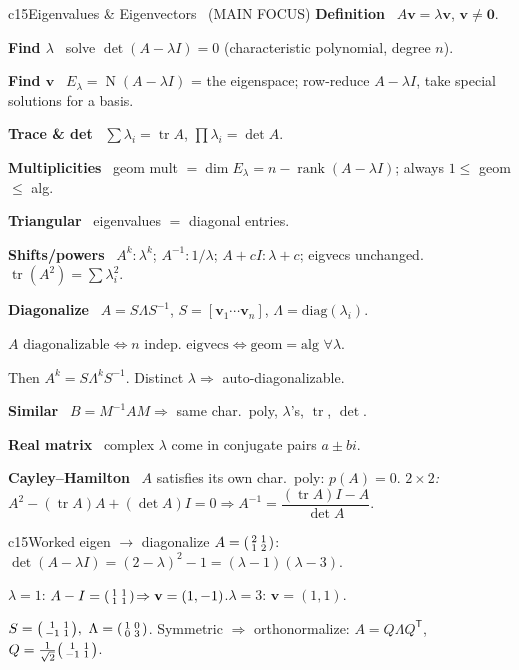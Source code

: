 \documentclass[10pt]{extarticle}
\newcommand{\h}[1]{{\bfseries #1}\ }
\newcommand{\key}[1]{\colorbox{hl}{$#1$}}
\newcommand{\T}{^{\mathsf T}}
\newcommand{\rank}{\operatorname{rank}}
\newcommand{\tr}{\operatorname{tr}}
\newcommand{\Nul}{\operatorname{N}}
\newcommand{\dimm}{\operatorname{dim}}
\newcommand{\bv}{\mathbf{v}}
\begin{document}
\begin{multicols}{2}
\begin{tbox}{c15}{Eigenvalues \& Eigenvectors \ \textnormal{(MAIN FOCUS)}}
\h{Definition} $A\bv=\lambda\bv$, $\bv\neq\mathbf0$.\par
\h{Find $\lambda$} solve \key{\det(A-\lambda I)=0} (characteristic polynomial, degree $n$).\par
\h{Find $\bv$} \key{E_\lambda=\Nul(A-\lambda I)} = the eigenspace; row-reduce $A-\lambda I$, take special solutions for a basis.\par
\h{Trace \& det} $\sum\lambda_i=\tr A$, \quad $\prod\lambda_i=\det A$.\par
\h{Multiplicities} geom mult $=\dimm E_\lambda=n-\rank(A-\lambda I)$; always $1\le$ geom $\le$ alg.\par
\h{Triangular} eigenvalues $=$ diagonal entries.\par
\h{Shifts/powers} $A^k\!:\lambda^k$; $A^{-1}\!:1/\lambda$; $A{+}cI:\lambda{+}c$; eigvecs unchanged. $\tr(A^2){=}\sum\lambda_i^2$.\par
\h{Diagonalize} $A=S\Lambda S^{-1}$, $S=[\bv_1\cdots\bv_n]$, $\Lambda=\mathrm{diag}(\lambda_i)$.\par
\key{A\text{ diagonalizable}\iff n\text{ indep. eigvecs}\iff\text{geom}=\text{alg }\forall\lambda}.\par
Then $A^k=S\Lambda^kS^{-1}$. Distinct $\lambda\Rightarrow$ auto-diagonalizable.\par
\h{Similar} $B=M^{-1}AM\Rightarrow$ same char.\ poly, $\lambda$'s, $\tr$, $\det$.\par
\h{Real matrix} complex $\lambda$ come in conjugate pairs $a\pm bi$.\par
\h{Cayley--Hamilton} $A$ satisfies its own char.\ poly: $p(A)=0$. \emph{$2{\times}2$:} $A^2-(\tr A)A+(\det A)I=0\Rightarrow A^{-1}=\dfrac{(\tr A)I-A}{\det A}$.
\end{tbox}

\begin{tbox}{c15}{Worked eigen $\to$ diagonalize}
\footnotesize $A=\begin{psmallmatrix}2&1\\1&2\end{psmallmatrix}$: $\det(A-\lambda I)=(2-\lambda)^2-1=(\lambda-1)(\lambda-3)$.\par
$\lambda{=}1$: $A-I=\begin{psmallmatrix}1&1\\1&1\end{psmallmatrix}\!\Rightarrow\bv=(1,-1)$.\quad $\lambda{=}3$: $\bv=(1,1)$.\par
$S=\begin{psmallmatrix}1&1\\-1&1\end{psmallmatrix},\ \Lambda=\begin{psmallmatrix}1&0\\0&3\end{psmallmatrix}$. Symmetric $\Rightarrow$ orthonormalize: $A=Q\Lambda Q\T$, $Q=\tfrac1{\sqrt2}\begin{psmallmatrix}1&1\\-1&1\end{psmallmatrix}$.
\end{tbox}


\end{multicols}
\end{document}

